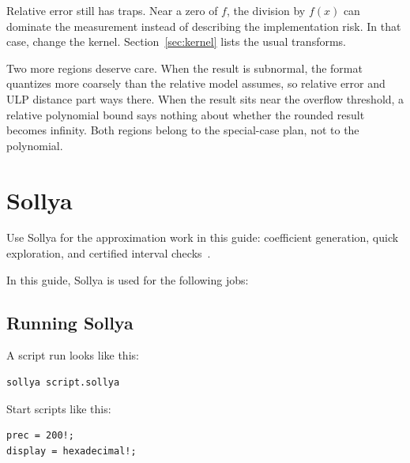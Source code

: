 \documentclass[manuscript, nonacm]{acmart}
\begin{document}
  Relative error still has traps. Near a zero of $f$, the division by $f(x)$
  can dominate the measurement instead of describing the implementation risk.
  In that case, change the kernel. Section~\ref{sec:kernel} lists the usual
  transforms.

  Two more regions deserve care. When the result is subnormal, the format
  quantizes more coarsely than the relative model assumes, so relative
  error and ULP distance part ways there. When the result sits near the
  overflow threshold, a relative polynomial bound says nothing about
  whether the rounded result becomes infinity. Both regions belong to the
  special-case plan, not to the polynomial.



  \section{Sollya}

  Use Sollya for the approximation work in this guide: coefficient generation,
  quick exploration, and certified interval checks~\cite{sollyapaper}.

  In this guide, Sollya is used for the following jobs:

  \subsection{Running Sollya}

  A script run looks like this:
  \begin{lstlisting}[style=shell]
sollya script.sollya
  \end{lstlisting}

  Start scripts like this:
  \begin{lstlisting}[style=sollya]
prec = 200!;
display = hexadecimal!;
  \end{lstlisting}
\end{document}
